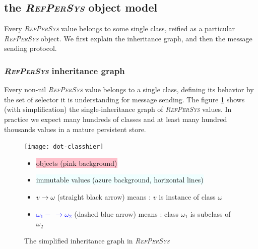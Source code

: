 \documentclass[11pt,a4paper,svgnames]{article}
\newcommand{\RefPerSys}{{\textit{\textsc{RefPerSys}}}}
\begin{document}

\medskip

\subsection{the {\RefPerSys} object model}
\label{subsec:objmodel}

Every {\RefPerSys} value belongs to some single class, reified as a
particular {\RefPerSys} object. We first explain the inheritance graph, and then the message sending protocol.

\subsubsection{{\RefPerSys} inheritance graph}
\label{subsubsec:inheritance}

Every non-nil {\RefPerSys} value belongs to a single class, defining
its behavior by the set of selector it is understanding for message
sending. The figure \ref{fig:inheritance} shows (with simplification)
the single-inheritance graph of {\RefPerSys} values. In practice we
expect many hundreds of classes and at least many hundred thousands
values in a mature persistent store.

\begin{figure}[h]
  \begin{center}
    \texttt{[image: dot-classhier]}
    \medskip
    \begin{relsize}{-1}
    \begin{itemize}
    \item \colorbox{pink}{objects (pink background)}
    \item \colorbox{Azure}{immutable values (azure background, horizontal lines)}
    \item \textcolor{black}{$v \longrightarrow \omega$} (straight  black arrow) means : $v$ is instance of class $\omega$
    \item \textcolor{blue}{$\omega_1 - ~ \rightarrow \omega_2 $} (dashed blue arrow) means : class $\omega_1$ is subclass of $\omega_2$
    \end{itemize}
    \end{relsize}
  \end{center}
  \caption{ The %
    simplified inheritance graph in \RefPerSys 
    }
  \label{fig:inheritance}
\end{figure}
\end{document}
